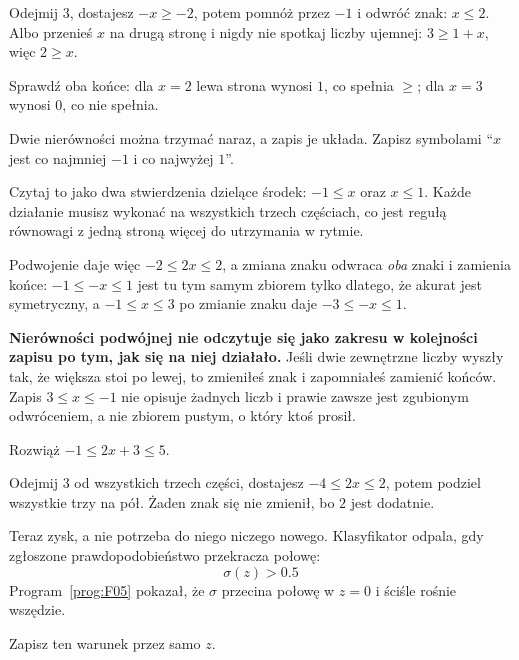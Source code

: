 \begin{fr}
Odejmij $3$, dostajesz $-x \ge -2$, potem pomnóż przez $-1$ i odwróć znak:
$x \le 2$. Albo przenieś $x$ na drugą stronę i nigdy nie spotkaj liczby
ujemnej: $3 \ge 1 + x$, więc $2 \ge x$.

Sprawdź oba końce: dla $x = 2$ lewa strona wynosi $1$, co spełnia $\ge$; dla
$x = 3$ wynosi $0$, co nie spełnia.

Dwie nierówności można trzymać naraz, a zapis je układa. Zapisz symbolami
\enquote{$x$ jest co najmniej $-1$ i co najwyżej $1$}.
\nextframe
\end{fr}

\begin{fr}
Czytaj to jako dwa stwierdzenia dzielące środek: $-1 \le x$ oraz $x \le 1$.
Każde działanie musisz wykonać na wszystkich trzech częściach, co jest regułą
równowagi z jedną stroną więcej do utrzymania w rytmie.

Podwojenie daje więc $-2 \le 2x \le 2$, a zmiana znaku odwraca \emph{oba}
znaki i zamienia końce: $-1 \le -x \le 1$ jest tu tym samym zbiorem tylko
dlatego, że akurat jest symetryczny, a $-1 \le x \le 3$ po zmianie znaku daje
$-3 \le -x \le 1$.

\begin{warning}
\textbf{Nierówności podwójnej nie odczytuje się jako zakresu w kolejności
zapisu po tym, jak się na niej działało.} Jeśli dwie zewnętrzne liczby wyszły
tak, że większa stoi po lewej, to zmieniłeś znak i zapomniałeś zamienić
końców. Zapis $3 \le x \le -1$ nie opisuje żadnych liczb i prawie zawsze jest
zgubionym odwróceniem, a nie zbiorem pustym, o który ktoś prosił.
\end{warning}

Rozwiąż $-1 \le 2x + 3 \le 5$.
\nextframe
\end{fr}

\begin{fr}
Odejmij $3$ od wszystkich trzech części, dostajesz $-4 \le 2x \le 2$, potem
podziel wszystkie trzy na pół. Żaden znak się nie zmienił, bo $2$ jest
dodatnie.

Teraz zysk, a nie potrzeba do niego niczego nowego. Klasyfikator odpala, gdy
zgłoszone prawdopodobieństwo przekracza połowę:
\[ \sigma(z) > \num{0.5} \]
Program~\ref{prog:F05} pokazał, że $\sigma$ przecina połowę w $z = 0$ i ściśle
rośnie wszędzie.

Zapisz ten warunek przez samo $z$.
\nextframe
\end{fr}

